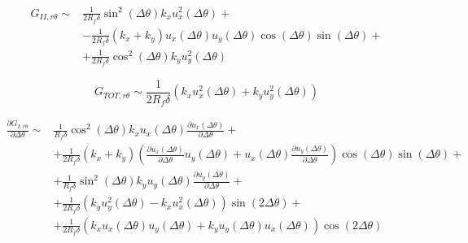 \documentclass[a4paper]{jpconf}
\begin{document}
\begin{equation}
\begin{split}
G_{II,r\theta} \sim&\frac{1}{2R_{f}\delta}\sin^{2}\left(\Delta\theta\right) k_{x}u^{2}_{x}\left(\Delta\theta\right)+\\
&-\frac{1}{2R_{f}\delta}\left(k_{x}+k_{y}\right)u_{x}\left(\Delta\theta\right)u_{y}\left(\Delta\theta\right)\cos\left(\Delta\theta\right)\sin\left(\Delta\theta\right)+\\
&+\frac{1}{2R_{f}\delta}\cos^{2}\left(\Delta\theta\right)k_{y}u^{2}_{y}\left(\Delta\theta\right)
\end{split}
\end{equation}

\begin{equation}
G_{TOT,r\theta} \sim\frac{1}{2R_{f}\delta}\left( k_{x}u^{2}_{x}\left(\Delta\theta\right)+ k_{y}u^{2}_{y}\left(\Delta\theta\right)\right)
\end{equation}

\begin{equation}
\begin{split}
\frac{\partial G_{I,r\theta}}{\partial\Delta\theta} \sim&\frac{1}{R_{f}\delta}\cos^{2}\left(\Delta\theta\right) k_{x}u_{x}\left(\Delta\theta\right)\frac{\partial u_{x}\left(\Delta\theta\right)}{\partial\Delta\theta}+\\
&+\frac{1}{2R_{f}\delta}\left(k_{x}+k_{y}\right)\left(\frac{\partial u_{x}\left(\Delta\theta\right)}{\partial\Delta\theta}u_{y}\left(\Delta\theta\right)+u_{x}\left(\Delta\theta\right)\frac{\partial u_{y}\left(\Delta\theta\right)}{\partial\Delta\theta}\right)\cos\left(\Delta\theta\right)\sin\left(\Delta\theta\right)+\\
&+\frac{1}{R_{f}\delta}\sin^{2}\left(\Delta\theta\right)k_{y}u_{y}\left(\Delta\theta\right)\frac{\partial u_{y}\left(\Delta\theta\right)}{\partial\Delta\theta}+\\
&+\frac{1}{2R_{f}\delta}\left(k_{y}u^{2}_{y}\left(\Delta\theta\right)- k_{x}u^{2}_{x}\left(\Delta\theta\right)\right)\sin\left(2\Delta\theta\right)+\\
&+\frac{1}{2R_{f}\delta}\left(k_{x}u_{x}\left(\Delta\theta\right)u_{y}\left(\Delta\theta\right)+k_{y}u_{y}\left(\Delta\theta\right)u_{x}\left(\Delta\theta\right)\right)\cos\left(2\Delta\theta\right)\\
\end{split}
\end{equation}
\end{document}
